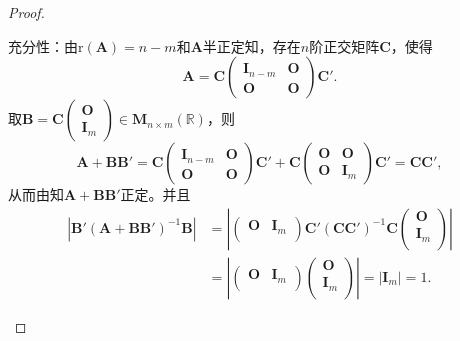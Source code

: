 \documentclass[../../main.tex]{subfiles}%
\begin{document}
\begin{proof}
\begin{enumerate}[(1)]
{\heiti 充分性：}由$\mathrm{r}\left( \boldsymbol{A} \right) =n-m$和$\boldsymbol{A}$半正定知，存在$n$阶正交矩阵$\boldsymbol{C}$，使得
$$\boldsymbol{A}=\boldsymbol{C}\begin{pmatrix} \boldsymbol{I}_{n-m}&\boldsymbol{O}\\ \boldsymbol{O}&\boldsymbol{O} \end{pmatrix}\boldsymbol{C}'.$$
取$\boldsymbol{B}=\boldsymbol{C}\begin{pmatrix} \boldsymbol{O}\\ \boldsymbol{I}_m \end{pmatrix} \in \boldsymbol{M}_{n\times m}\left( \mathbb{R} \right)$，则
$$\boldsymbol{A}+\boldsymbol{BB}'=\boldsymbol{C}\begin{pmatrix} \boldsymbol{I}_{n-m}&\boldsymbol{O}\\ \boldsymbol{O}&\boldsymbol{O} \end{pmatrix}\boldsymbol{C}'+\boldsymbol{C}\begin{pmatrix} \boldsymbol{O}&\boldsymbol{O}\\ \boldsymbol{O}&\boldsymbol{I}_m \end{pmatrix}\boldsymbol{C}'=\boldsymbol{CC}',$$
从而由知$\boldsymbol{A}+\boldsymbol{BB}'$正定。并且
\begin{align*}
\left| \boldsymbol{B}' \left( \boldsymbol{A}+\boldsymbol{BB}' \right) ^{-1}\boldsymbol{B} \right|&=\left| \left( \begin{matrix}
\boldsymbol{O}&		\boldsymbol{I}_m\\
\end{matrix} \right) \boldsymbol{C}' \left( \boldsymbol{CC}' \right) ^{-1}\boldsymbol{C}\left( \begin{array}{c}
\boldsymbol{O}\\
\boldsymbol{I}_m\\
\end{array} \right) \right|
\\
&=\left| \left( \begin{matrix}
\boldsymbol{O}&		\boldsymbol{I}_m\\
\end{matrix} \right) \left( \begin{array}{c}
\boldsymbol{O}\\
\boldsymbol{I}_m\\
\end{array} \right) \right|=\left| \boldsymbol{I}_m \right|=1.
\end{align*}
\end{enumerate}

\end{proof}
\end{document}
